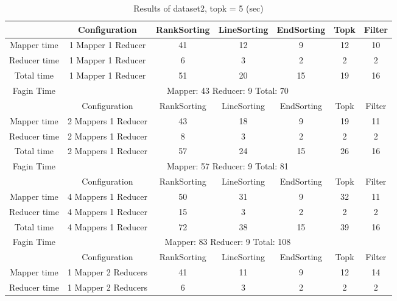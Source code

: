 \documentclass[a4paper]{article}
\begin{document}
\begin{table}[htbp]
    \caption{Results of dataset2, topk = 5 (sec)}
    \begin{center}
        \begin{tabular}{|c|c|c|c|c|c|c|}
            \hline
             & Configuration & RankSorting & LineSorting & EndSorting & Topk & Filter  \\
            \hline
            Mapper time & 1 Mapper 1 Reducer & 41 & 12 & 9 & 12 & 10  \\
            Reducer time & 1 Mapper 1 Reducer & 6 & 3 & 2 & 2 & 2   \\
            Total time & 1 Mapper 1 Reducer & 51 & 20 & 15 & 19 & 16 \\
            \hline
            Fagin Time & \multicolumn{6}{|c|}{Mapper: 43 Reducer: 9 Total: 70}  \\
            \hline
            \hline
             & Configuration & RankSorting & LineSorting & EndSorting & Topk & Filter  \\
            \hline
            Mapper time & 2 Mappers 1 Reducer & 43 & 18 & 9 & 19 & 11  \\
            Reducer time & 2 Mappers 1 Reducer & 8 & 3 & 2 & 2 & 2   \\
            Total time & 2 Mappers 1 Reducer & 57 & 24 & 15 & 26 & 16 \\
            \hline
            Fagin Time & \multicolumn{6}{|c|}{Mapper: 57 Reducer: 9 Total: 81}  \\
            \hline
            \hline
             & Configuration & RankSorting & LineSorting & EndSorting & Topk & Filter  \\
            \hline
            Mapper time & 4 Mappers 1 Reducer & 50 & 31 & 9 & 32 & 11  \\
            Reducer time & 4 Mappers 1 Reducer & 15 & 3 & 2 & 2 & 2   \\
            Total time & 4 Mappers 1 Reducer & 72 & 38 & 15 & 39 & 16 \\
            \hline
            Fagin Time & \multicolumn{6}{|c|}{Mapper: 83 Reducer: 9 Total: 108}  \\
            \hline
            \hline
             & Configuration & RankSorting & LineSorting & EndSorting & Topk & Filter  \\
            \hline
            Mapper time & 1 Mapper 2 Reducers & 41 & 11 & 9 & 12 & 14  \\
            Reducer time & 1 Mapper 2 Reducers & 6 & 3 & 2 & 2 & 2   \\

\end{tabular}
\end{center}
\end{table}
\end{document}
